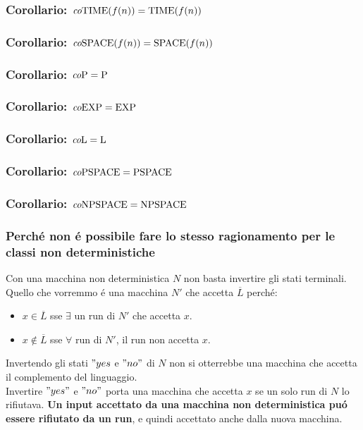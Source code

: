 \subsubsection{Corollario: $\textit{co} \text{TIME}(f(n)) = \text{TIME}(f(n))$}
\subsubsection{Corollario: $\textit{co} \text{SPACE}(f(n)) = \text{SPACE}(f(n))$}
\subsubsection{Corollario: $\textit{co} \text{P} = \text{P}$}
\subsubsection{Corollario: $\textit{co} \text{EXP} = \text{EXP}$}
\subsubsection{Corollario: $\textit{co} \text{L} = \text{L}$}
\subsubsection{Corollario: $\textit{co} \text{PSPACE} = \text{PSPACE}$}
\subsubsection{Corollario: $\textit{co} \text{NPSPACE} = \text{NPSPACE}$}
\subsubsection{Perché non é possibile fare lo stesso ragionamento per le classi non deterministiche}
Con una macchina non deterministica $N$ non basta invertire gli stati terminali. \\
Quello che vorremmo é una macchina $N'$ che accetta $\overline{L}$ perché:
\begin{itemize}
\item $x \in \overline{L}$ sse $\exists$ un run di $N'$ che accetta $x$.
\item $x \notin \overline{L}$ sse $\forall$ run di $N'$, il run non accetta $x$.
\end{itemize}
Invertendo gli stati $"yes$ e $"no"$ di $N$ non si otterrebbe una macchina che accetta il complemento del linguaggio. \\ 
Invertire $"yes"$ e $"no"$ porta una macchina che accetta $x$ se un solo run di $N$ lo rifiutava. 
\textbf{Un input accettato da una macchina non deterministica puó essere rifiutato da un run}, e quindi accettato anche dalla nuova macchina. \\

